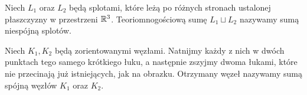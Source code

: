 \begin{definition}
    Niech $L_1$ oraz $L_2$ będą splotami, które leżą po różnych stronach ustalonej płaszczyzny w przestrzeni $\mathbb R^3$.
    Teoriomnogościową sumę $L_1 \sqcup L_2$ nazywamy sumą niespójną splotów.
\end{definition}

\begin{definition}
    Niech $K_1, K_2$ będą zorientowanymi węzłami.
    Natnijmy każdy z nich w dwóch punktach tego samego krótkiego łuku, a następnie zszyjmy dwoma łukami, które nie przecinają już istniejących, jak na obrazku.
    Otrzymany węzeł nazywamy sumą spójną węzłów $K_1$ oraz $K_2$.

\end{definition}
